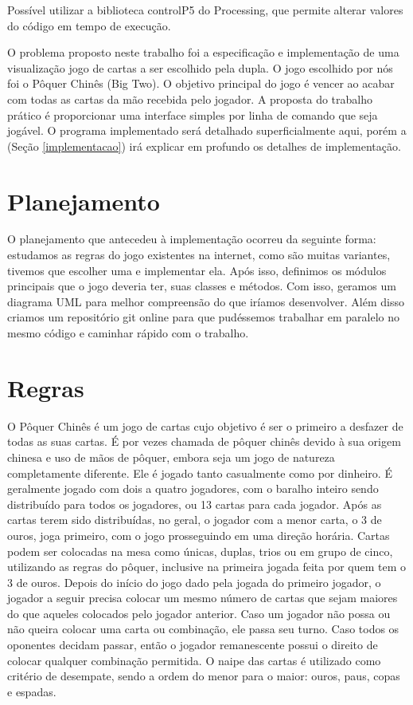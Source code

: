 \documentclass[12pt]{article}
\begin{document}
Possível utilizar a biblioteca controlP5 do Processing, que permite alterar valores do código em tempo de execução.


O problema proposto neste trabalho foi a especificação e implementação de uma visualização jogo de cartas a ser escolhido pela dupla. O jogo escolhido por nós foi o Pôquer Chinês (Big Two). O objetivo principal do jogo é vencer ao acabar com todas as cartas da mão recebida pelo jogador. A proposta do trabalho prático é proporcionar uma interface simples por linha de comando que seja jogável. O programa implementado será detalhado superficialmente aqui, porém a (Seção \ref{implementacao}) irá explicar em profundo os detalhes de implementação.

\section{Planejamento}
\label{planejamento}

O planejamento que antecedeu à implementação ocorreu da seguinte forma: estudamos as regras do jogo existentes na internet, como são muitas variantes, tivemos que escolher uma e implementar ela. Após isso, definimos os módulos principais que o jogo deveria ter, suas classes e métodos. Com isso, geramos um diagrama UML para melhor compreensão do que iríamos desenvolver. Além disso criamos um repositório git online para que pudéssemos trabalhar em paralelo no mesmo código e caminhar rápido com o trabalho.

\section{Regras}
\label{regras}

O Pôquer Chinês \cite{bigtwo} é um jogo de cartas cujo objetivo é ser o primeiro a desfazer de todas as suas cartas. É por vezes chamada de pôquer chinês devido à sua origem chinesa e uso de mãos de pôquer, embora seja um jogo de natureza completamente diferente.
Ele é jogado tanto casualmente como por dinheiro. É geralmente jogado com dois a quatro jogadores, com o baralho inteiro sendo distribuído para todos os jogadores, ou 13 cartas para cada jogador.
Após as cartas terem sido distribuídas, no geral, o jogador com a menor carta, o 3 de ouros, joga primeiro, com o jogo prosseguindo em uma direção horária. Cartas podem ser colocadas na mesa como únicas, duplas, trios ou em grupo de cinco, utilizando as regras do pôquer, inclusive na primeira jogada feita por quem tem o 3 de ouros.
Depois do início do jogo dado pela jogada do primeiro jogador, o jogador a seguir precisa colocar um mesmo número de cartas que sejam maiores do que aqueles colocados pelo jogador anterior. Caso um jogador não possa ou não queira colocar uma carta ou combinação, ele passa seu turno. Caso todos os oponentes decidam passar, então o jogador remanescente possui o direito de colocar qualquer combinação permitida. O naipe das cartas é utilizado como critério de desempate, sendo a ordem do menor para o maior: ouros, paus, copas e espadas.
\end{document}

